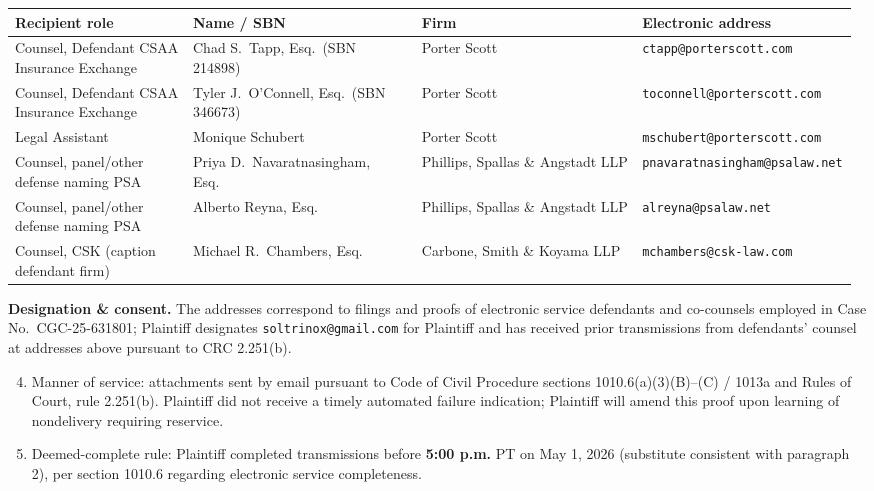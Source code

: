 \begin{tabular}{@{}>{\raggedright\arraybackslash}p{0.21\linewidth}>{\raggedright\arraybackslash}p{0.27\linewidth}>{\raggedright\arraybackslash}p{0.26\linewidth}>{\raggedright\arraybackslash}p{0.24\linewidth}@{}}
\hline\textbf{Recipient role} & \textbf{Name / SBN} & \textbf{Firm} & \textbf{Electronic address} \\\hline
Counsel, Defendant CSAA Insurance Exchange & Chad S.\ Tapp, Esq.\ (SBN 214898) & Porter Scott & \texttt{ctapp@porterscott.com} \\
Counsel, Defendant CSAA Insurance Exchange & Tyler J.\ O'Connell, Esq.\ (SBN 346673) & Porter Scott & \texttt{toconnell@porterscott.com} \\
Legal Assistant & Monique Schubert & Porter Scott & \texttt{mschubert@porterscott.com} \\
Counsel, panel/other defense naming PSA & Priya D.\ Navaratnasingham, Esq.\ & Phillips, Spallas \& Angstadt LLP & \texttt{pnavaratnasingham@psalaw.net} \\
Counsel, panel/other defense naming PSA & Alberto Reyna, Esq.\ & Phillips, Spallas \& Angstadt LLP & \texttt{alreyna@psalaw.net} \\
Counsel, CSK (caption defendant firm) & Michael R.\ Chambers, Esq.\ & Carbone, Smith \& Koyama LLP & \texttt{mchambers@csk-law.com} \\
\hline
\end{tabular}\par\vspace{\baselineskip}

\textbf{Designation \& consent.} The addresses correspond to filings and proofs of electronic service defendants and co-counsels employed in Case No.\ CGC-25-631801; Plaintiff designates \texttt{soltrinox@gmail.com} for Plaintiff and has received prior transmissions from defendants' counsel at addresses above pursuant to CRC 2.251(b).

\begin{enumerate}\setcounter{enumi}{3}
\item Manner of service: attachments sent by email pursuant to Code of Civil Procedure sections 1010.6(a)(3)(B)--(C) / 1013a and Rules of Court, rule 2.251(b). Plaintiff did not receive a timely automated failure indication; Plaintiff will amend this proof upon learning of nondelivery requiring reservice.\par
\item Deemed-complete rule: Plaintiff completed transmissions before \textbf{5:00 p.m.} PT on May 1, 2026 (substitute consistent with paragraph 2), per section 1010.6 regarding electronic service completeness.
\end{enumerate}

